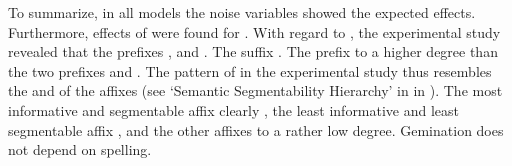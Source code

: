 To summarize, in all models the noise variables showed the expected effects. Furthermore, effects of  were found for . 
With regard to , the experimental study revealed that the prefixes ,  and  . The suffix  . 
The prefix   to a higher degree than the two prefixes and . The pattern of  in the experimental study thus resembles the  and  of the affixes (see `Semantic Segmentability Hierarchy' in  in ). The most informative and segmentable affix  clearly , the least informative and least segmentable affix  , and the other affixes  to a rather low degree. Gemination does not depend on spelling. 


